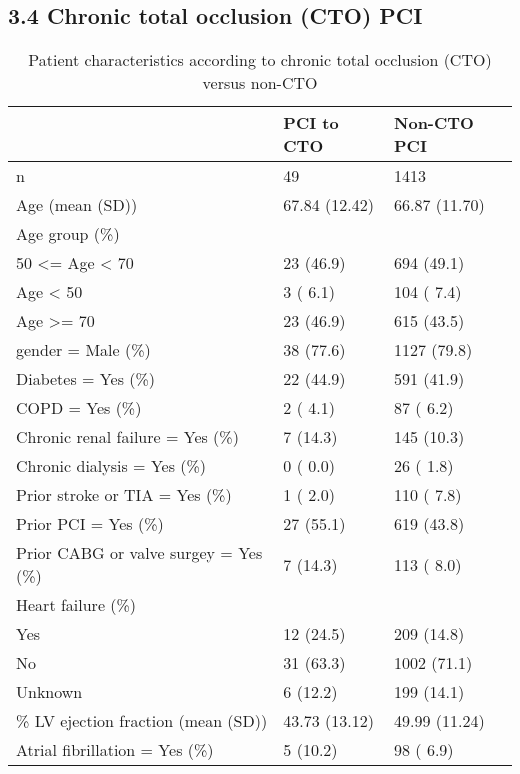 \documentclass[
]{article}
\begin{document}
\clearpage

\hypertarget{chronic-total-occlusion-cto-pci}{%
\subsection{3.4 Chronic total occlusion (CTO)
PCI}\label{chronic-total-occlusion-cto-pci}}

\begin{longtable}[t]{lll}
\caption{\label{tab:table 35}Patient characteristics according to chronic total occlusion (CTO) versus non-CTO}\\
\toprule
 & PCI to CTO & Non-CTO PCI\\
\midrule
n & 49 & 1413\\
Age (mean (SD)) & 67.84 (12.42) & 66.87 (11.70)\\
Age group (\%) &  & \\
\hspace{1em}50 <= Age < 70 & 23 (46.9) & 694 (49.1)\\
\hspace{1em}Age < 50 & 3 ( 6.1) & 104 ( 7.4)\\
\addlinespace
\hspace{1em}Age >= 70 & 23 (46.9) & 615 (43.5)\\
gender = Male (\%) & 38 (77.6) & 1127 (79.8)\\
Diabetes = Yes (\%) & 22 (44.9) & 591 (41.9)\\
COPD = Yes (\%) & 2 ( 4.1) & 87 ( 6.2)\\
Chronic renal failure = Yes (\%) & 7 (14.3) & 145 (10.3)\\
\addlinespace
Chronic dialysis = Yes (\%) & 0 ( 0.0) & 26 ( 1.8)\\
Prior stroke or TIA = Yes (\%) & 1 ( 2.0) & 110 ( 7.8)\\
Prior PCI = Yes (\%) & 27 (55.1) & 619 (43.8)\\
Prior CABG or valve surgey = Yes (\%) & 7 (14.3) & 113 ( 8.0)\\
Heart failure (\%) &  & \\
\addlinespace
\hspace{1em}Yes & 12 (24.5) & 209 (14.8)\\
\hspace{1em}No & 31 (63.3) & 1002 (71.1)\\
\hspace{1em}Unknown & 6 (12.2) & 199 (14.1)\\
\% LV ejection fraction (mean (SD)) & 43.73 (13.12) & 49.99 (11.24)\\
Atrial fibrillation = Yes (\%) & 5 (10.2) & 98 ( 6.9)\\
\bottomrule
\end{longtable}
\end{document}
